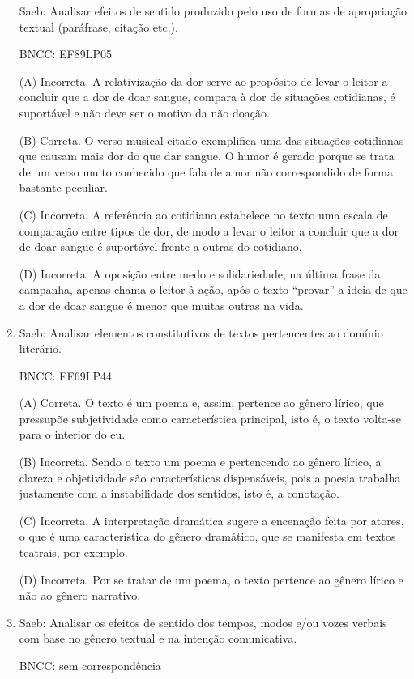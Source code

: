 \begin{enumerate}
Saeb: Analisar efeitos de sentido produzido pelo uso de formas de
apropriação textual (paráfrase, citação etc.).

BNCC: EF89LP05

(A) Incorreta. A relativização da dor serve ao propósito de levar o
leitor a concluir que a dor de doar sangue, compara à dor de situações
cotidianas, é suportável e não deve ser o motivo da não doação.

(B) Correta. O verso musical citado exemplifica uma das situações
cotidianas que causam mais dor do que dar sangue. O humor é gerado
porque se trata de um verso muito conhecido que fala de amor não
correspondido de forma bastante peculiar.

(C) Incorreta. A referência ao cotidiano estabelece no texto uma escala
de comparação entre tipos de dor, de modo a levar o leitor a concluir
que a dor de doar sangue é suportável frente a outras do cotidiano.

(D) Incorreta. A oposição entre medo e solidariedade, na última frase da
campanha, apenas chama o leitor à ação, após o texto ``provar'' a ideia
de que a dor de doar sangue é menor que muitas outras na vida.


\item

Saeb: Analisar elementos constitutivos de textos pertencentes ao domínio
literário.

BNCC: EF69LP44

(A) Correta. O texto é um poema e, assim, pertence ao gênero lírico, que
pressupõe subjetividade como característica principal, isto é, o texto
volta-se para o interior do eu.

(B) Incorreta. Sendo o texto um poema e pertencendo ao gênero lírico, a
clareza e objetividade são características dispensáveis, pois a poesia
trabalha justamente com a instabilidade dos sentidos, isto é, a
conotação.

(C) Incorreta. A interpretação dramática sugere a encenação feita por
atores, o que é uma característica do gênero dramático, que se manifesta
em textos teatrais, por exemplo.

(D) Incorreta. Por se tratar de um poema, o texto pertence ao gênero
lírico e não ao gênero narrativo.


\item

Saeb: Analisar os efeitos de sentido dos tempos, modos e/ou vozes
verbais com base no gênero textual e na intenção comunicativa.

BNCC: sem correspondência


\end{enumerate}
